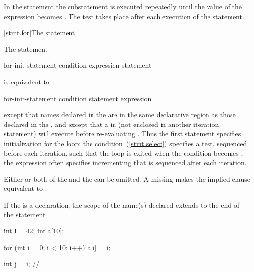 \pnum
In the  statement the substatement is executed repeatedly
until the value of the expression becomes . The test takes
place after each execution of the statement.

[stmt.for]{The  statement}%

\pnum
The  statement

\begin{ncbnf}
 for-init-statement condition\opt \terminal{;} expression\opt \terminal{)} statement
\end{ncbnf}

is equivalent to

\begin{ncbnftab}
\terminal{\{}\br
\>for-init-statement\br
\> condition \terminal{) \{}\br
\>\>statement\br
\>\>expression \terminal{;}\br
\>\terminal{\}}\br
\terminal{\}}
\end{ncbnftab}

except that names declared in the  are in
the same declarative region as those declared in the
, and except that a
%
 in  (not enclosed in another
iteration statement) will execute  before
re-evaluating .
\enternote
Thus the first statement specifies initialization for the loop; the
condition~(\ref{stmt.select}) specifies a test, sequenced before each
iteration, such that the loop is exited when the condition becomes
; the expression often specifies incrementing that is
sequenced after each iteration.
\exitnote

\pnum
Either or both of the 
and the  can be omitted.
A missing 
makes the implied  clause
equivalent to .

\pnum
{}%
%
If the  is a declaration, the scope of the
name(s) declared extends to the end of the  statement.
\enterexample

\begin{codeblock}
int i = 42;
int a[10];

for (int i = 0; i < 10; i++)
  a[i] = i;

int j = i;          // 
\end{codeblock}
\exitexample

